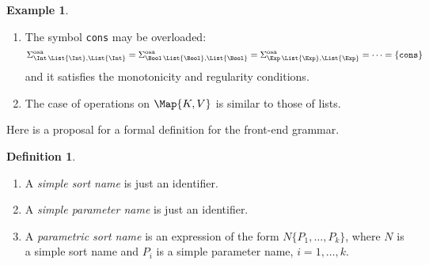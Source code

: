 \documentclass{article}
\theoremstyle{definition}
\newtheorem{example}{Example}[section]
\theoremstyle{definition}
\theoremstyle{definition}
\newtheorem{definition}{Definition}[section]
\theoremstyle{definition}
\theoremstyle{definition}
\theoremstyle{theorem}
\theoremstyle{theorem}
\theoremstyle{theorem}
\theoremstyle{theorem}
\theoremstyle{theorem}
\newcommand{\KWempty}[1]{\texttt{empty}\{#1\}}
\begin{document}
{\begin{example}
\begin{enumerate}
\begin{enumerate}
\[\]
then we loose the monotonicity. If we consider a distinguished symbol $\KWempty{\theta(V)}$ for each instance $\theta(V)$,
\begin{align*}
&\Sigma^\textrm{osa}_{\varepsilon,\List{\Int}}=\{\KWempty{\Int}\}\\
&\Sigma^\textrm{osa}_{\varepsilon,\List{\Bool}}=\{\KWempty{\Bool}\}\\
&\Sigma^\textrm{osa}_{\varepsilon,\List{\Exp}}=\{\KWempty{\Exp}\}\\
&\ldots
\end{align*}
we have, e.g., three unrelated terms of sort \List{\Exp}:  \KWempty{\Int}, \KWempty{\Bool}, \KWempty{\Exp}. In ML these term patterns are related with the corresponding instances of the  "aggressive" axiom on page~\pageref{axiom-parametric-symbol} (adapted for constants):
\begin{align*}
&\inj\{\List{\Int},\List{\Exp}\}(\KWempty{\Int})=\KWempty{\Exp}()\\
&\inj\{\List{\Bool},\List{\Exp}\}(\KWempty{\Bool})=\KWempty{\Exp}()
\end{align*}
Another solution to get a (monotonic) order-sorted signature is to forbid productions as above and use a new sort for the unique terminal:
\begin{align*}
&\syntax\ \texttt{EmptyList} ::= \texttt{empty}\\
&\syntax\{V\}\ \List{V} ::= \texttt{EmptyList}
\end{align*}
We get $\texttt{EmptyList}\le \List{\Int}$, $\texttt{EmptyList}\le \List{\Bool}$, $\texttt{EmptyList}\le \List{\Exp}$, $\texttt{EmptyList}\le \List{\List{\Int}}$, \ldots .

\item
The symbol \texttt{cons} may be overloaded:
\[
\Sigma^\textrm{osa}_{\Int\,\List{\Int},\List{\Int}}=\Sigma^\textrm{osa}_{\Bool\,\List{\Bool},\List{\Bool}}=\Sigma^\textrm{osa}_{\Exp\,\List{\Exp},\List{\Exp}}=\cdots=\{\texttt{cons}\}
\] 
and it satisfies the monotonicity and regularity conditions.
\item
The case of operations on $\Map{K,V}$ is similar to those of lists.
\end{enumerate}
\end{enumerate}

\end{example}

Here is a proposal for a formal definition for the front-end grammar.

\begin{definition}
\begin{enumerate}
\item A \emph{simple sort name} is   just an identifier.
\item A \emph{simple parameter name}  is   just an identifier.
\item A  \emph{parametric sort name} is an expression of the form $N\{P_1,\ldots,P_k\}$, where $N$ is a simple sort name and $P_i$ is a simple parameter name, $i=1,\ldots,k$.
\end{enumerate}


\end{definition}}
\end{document}
